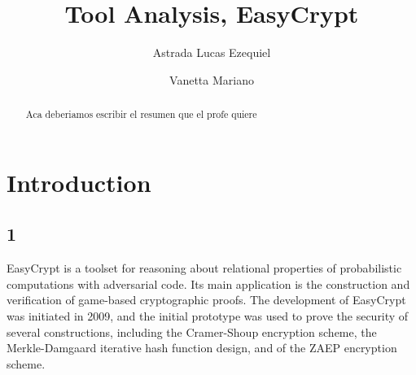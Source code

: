 \documentclass[runningheads,a4paper]{llncs}
\begin{document}
\mainmatter  %

\title{Tool Analysis, EasyCrypt}


%
%
\author{Astrada Lucas Ezequiel
\and Vanetta Mariano}
%


%
%

\maketitle


\begin{abstract}
Aca deberiamos escribir el resumen que el profe quiere
\end{abstract}


\section{Introduction}



\subsection{1}
EasyCrypt is a toolset for reasoning about relational properties of probabilistic computations with adversarial code. Its main application is the construction and verification of game-based cryptographic proofs. The development of EasyCrypt was initiated in 2009, and the initial prototype was used to prove the security of several constructions, including the Cramer-Shoup encryption scheme, the Merkle-Damgaard iterative hash function design, and of the ZAEP encryption scheme.
\end{document}
